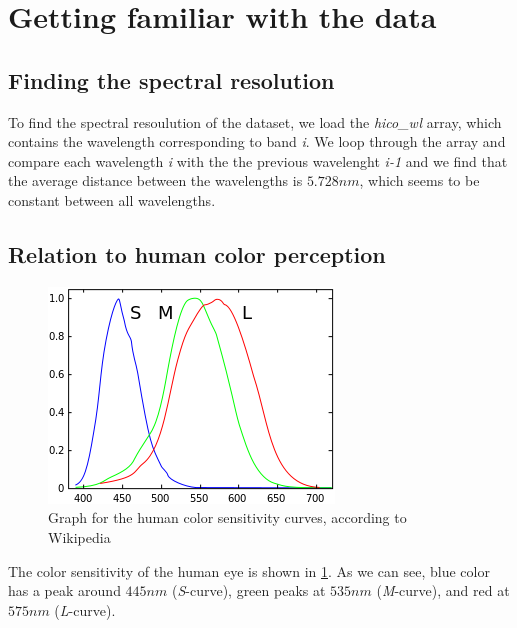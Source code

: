\section{Getting familiar with the data}

\subsection{Finding the spectral resolution}

To find the spectral resoulution of the dataset, we load the \textit{hico\_wl} array, which contains the
wavelength corresponding to band \textit{i}. We loop through the array and compare each wavelength
\textit{i} with the the previous wavelenght \textit{i-1} and we find that the average distance between
the wavelengths is $5.728 nm$, which seems to be constant between all wavelengths. 

\subsection{Relation to human color perception}

\begin{figure}
    \centering
    \includegraphics[width=\textwidth]{../fig/human_spectrum.png}
    \caption{Graph for the human color sensitivity curves, according to Wikipedia \cite{website:wiki_spectral}}
    \label{fig:human_spectra}
\end{figure}

The color sensitivity of the human eye is shown in \cref{fig:human_spectra}. As we can 
see, blue color has a peak around $445 nm$ (\textit{S}-curve), green peaks at $535 nm$ 
(\textit{M}-curve), and red at $575 nm$ (\textit{L}-curve). 

